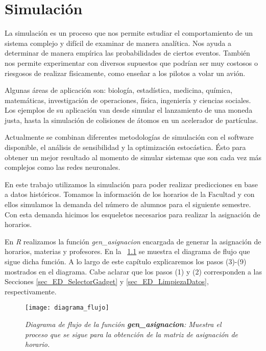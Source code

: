 \chapter{Simulación}

La simulación es un proceso que nos permite estudiar el comportamiento de un sistema complejo y difícil de examinar de manera analítica. Nos ayuda a determinar de manera empírica las probabilidades de ciertos eventos. También nos permite experimentar con diversos supuestos que podrían ser muy costosos o riesgosos de realizar físicamente, como enseñar a los pilotos a volar un avión.

Algunas áreas de aplicación son: biología, estadística, medicina, química, matemáticas, investigación de operaciones, física, ingeniería y ciencias sociales. Los ejemplos de su aplicación van desde simular el lanzamiento de una moneda justa, hasta la simulación de colisiones de átomos en un acelerador de partículas.

Actualmente se combinan diferentes metodologías de simulación con el software disponible, el análisis de sensibilidad y la optimización estocástica. Ésto para obtener un mejor resultado al momento de simular sistemas que son cada vez más complejos como las redes neuronales.

En este trabajo utilizamos la simulación para poder realizar predicciones en base a datos históricos. Tomamos la información de los horarios de la Facultad y con ellos simulamos la demanda del número de alumnos para el siguiente semestre. Con esta demanda hicimos los esqueletos necesarios para realizar la asignación de horarios.

En \textit{R} realizamos la función \textit{gen\_asignacion} encargada de generar la asignación de horarios, materias y profesores. En la \figurename{~\ref{DF_genAsig}} se muestra el diagrama de flujo que sigue dicha función. A lo largo de este capítulo explicaremos los pasos (3)-(9) mostrados en el diagrama. Cabe aclarar que los pasos (1) y (2) corresponden a las Secciones \ref{sec_ED_SelectorGadget} y \ref{sec_ED_LimpiezaDatos}, respectivamente.

\begin{figure}[H]
\centering
\texttt{[image: diagrama\_flujo]} %
\caption[\textit{Diagrama de flujo de la función \textbf{gen\_asignacion}}]{\textit{Diagrama de flujo de la función \textbf{gen\_asignacion}: Muestra el proceso que se sigue para la obtención de la matriz de asignación de horario.}}\label{DF_genAsig}
\end{figure}


